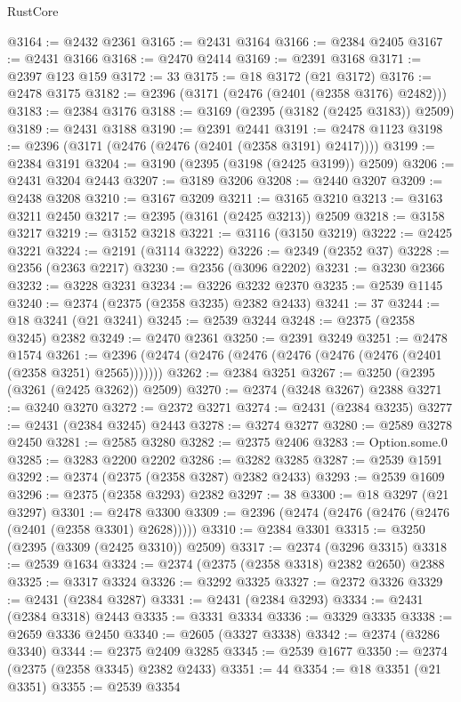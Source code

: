 \begin{lexlean}{RustCore}
\begin{coremodule}
@3164 := @2432 @2361
@3165 := @2431 @3164
@3166 := @2384 @2405
@3167 := @2431 @3166
@3168 := @2470 @2414
@3169 := @2391 @3168
@3171 := @2397 @123 @159
@3172 := 33
@3175 := @18 @3172 (@21 @3172)
@3176 := @2478 @3175
@3182 := @2396 (@3171 (@2476 (@2401 (@2358 @3176) @2482)))
@3183 := @2384 @3176
@3188 := @3169 (@2395 (@3182 (@2425 @3183)) @2509)
@3189 := @2431 @3188
@3190 := @2391 @2441
@3191 := @2478 @1123
@3198 := @2396 (@3171 (@2476 (@2476 (@2401 (@2358 @3191) @2417))))
@3199 := @2384 @3191
@3204 := @3190 (@2395 (@3198 (@2425 @3199)) @2509)
@3206 := @2431 @3204 @2443
@3207 := @3189 @3206
@3208 := @2440 @3207
@3209 := @2438 @3208
@3210 := @3167 @3209
@3211 := @3165 @3210
@3213 := @3163 @3211 @2450
@3217 := @2395 (@3161 (@2425 @3213)) @2509
@3218 := @3158 @3217
@3219 := @3152 @3218
@3221 := @3116 (@3150 @3219)
@3222 := @2425 @3221
@3224 := @2191 (@3114 @3222)
@3226 := @2349 (@2352 @37)
@3228 := @2356 (@2363 @2217)
@3230 := @2356 (@3096 @2202)
@3231 := @3230 @2366
@3232 := @3228 @3231
@3234 := @3226 @3232 @2370
@3235 := @2539 @1145
@3240 := @2374 (@2375 (@2358 @3235) @2382 @2433)
@3241 := 37
@3244 := @18 @3241 (@21 @3241)
@3245 := @2539 @3244
@3248 := @2375 (@2358 @3245) @2382
@3249 := @2470 @2361
@3250 := @2391 @3249
@3251 := @2478 @1574
@3261 := @2396 (@2474 (@2476 (@2476 (@2476 (@2476 (@2476 (@2401 (@2358 @3251) @2565)))))))
@3262 := @2384 @3251
@3267 := @3250 (@2395 (@3261 (@2425 @3262)) @2509)
@3270 := @2374 (@3248 @3267) @2388
@3271 := @3240 @3270
@3272 := @2372 @3271
@3274 := @2431 (@2384 @3235)
@3277 := @2431 (@2384 @3245) @2443
@3278 := @3274 @3277
@3280 := @2589 @3278 @2450
@3281 := @2585 @3280
@3282 := @2375 @2406
@3283 := Option.some.{0}
@3285 := @3283 @2200 @2202
@3286 := @3282 @3285
@3287 := @2539 @1591
@3292 := @2374 (@2375 (@2358 @3287) @2382 @2433)
@3293 := @2539 @1609
@3296 := @2375 (@2358 @3293) @2382
@3297 := 38
@3300 := @18 @3297 (@21 @3297)
@3301 := @2478 @3300
@3309 := @2396 (@2474 (@2476 (@2476 (@2476 (@2401 (@2358 @3301) @2628)))))
@3310 := @2384 @3301
@3315 := @3250 (@2395 (@3309 (@2425 @3310)) @2509)
@3317 := @2374 (@3296 @3315)
@3318 := @2539 @1634
@3324 := @2374 (@2375 (@2358 @3318) @2382 @2650) @2388
@3325 := @3317 @3324
@3326 := @3292 @3325
@3327 := @2372 @3326
@3329 := @2431 (@2384 @3287)
@3331 := @2431 (@2384 @3293)
@3334 := @2431 (@2384 @3318) @2443
@3335 := @3331 @3334
@3336 := @3329 @3335
@3338 := @2659 @3336 @2450
@3340 := @2605 (@3327 @3338)
@3342 := @2374 (@3286 @3340)
@3344 := @2375 @2409 @3285
@3345 := @2539 @1677
@3350 := @2374 (@2375 (@2358 @3345) @2382 @2433)
@3351 := 44
@3354 := @18 @3351 (@21 @3351)
@3355 := @2539 @3354

\end{coremodule}
\end{lexlean}
